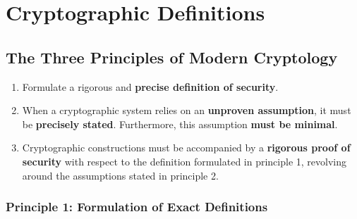 \chapter{Cryptographic Definitions}


\section{The Three Principles of Modern Cryptology}

\begin{enumerate}
    \item Formulate a rigorous and \textbf{precise definition of security}.
    \item When a cryptographic system relies on an \textbf{unproven assumption}, it must be \textbf{precisely stated}. Furthermore, this assumption \textbf{must be minimal}.
    \item Cryptographic constructions must be accompanied by a \textbf{rigorous proof of security} with respect to the definition formulated in principle 1, revolving around the assumptions stated in principle 2.
\end{enumerate}

\subsection{Principle 1: Formulation of Exact Definitions}

